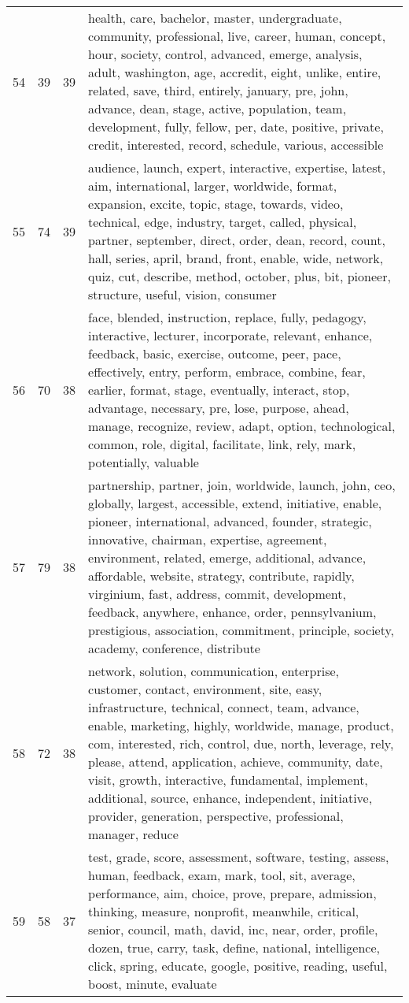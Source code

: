 \begin{table}[ht]
{\begin{tabularx}{\textwidth}{llrX}
   54 & 39 & 39 & health, care, bachelor, master, undergraduate, community, professional, live, career, human, concept, hour, society, control, advanced, emerge, analysis, adult, washington, age, accredit, eight, unlike, entire, related, save, third, entirely, january, pre, john, advance, dean, stage, active, population, team, development, fully, fellow, per, date, positive, private, credit, interested, record, schedule, various, accessible \\ 
   55 & 74 & 39 & audience, launch, expert, interactive, expertise, latest, aim, international, larger, worldwide, format, expansion, excite, topic, stage, towards, video, technical, edge, industry, target, called, physical, partner, september, direct, order, dean, record, count, hall, series, april, brand, front, enable, wide, network, quiz, cut, describe, method, october, plus, bit, pioneer, structure, useful, vision, consumer \\ 
   56 & 70 & 38 & face, blended, instruction, replace, fully, pedagogy, interactive, lecturer, incorporate, relevant, enhance, feedback, basic, exercise, outcome, peer, pace, effectively, entry, perform, embrace, combine, fear, earlier, format, stage, eventually, interact, stop, advantage, necessary, pre, lose, purpose, ahead, manage, recognize, review, adapt, option, technological, common, role, digital, facilitate, link, rely, mark, potentially, valuable \\ 
   57 & 79 & 38 & partnership, partner, join, worldwide, launch, john, ceo, globally, largest, accessible, extend, initiative, enable, pioneer, international, advanced, founder, strategic, innovative, chairman, expertise, agreement, environment, related, emerge, additional, advance, affordable, website, strategy, contribute, rapidly, virginium, fast, address, commit, development, feedback, anywhere, enhance, order, pennsylvanium, prestigious, association, commitment, principle, society, academy, conference, distribute \\ 
   58 & 72 & 38 & network, solution, communication, enterprise, customer, contact, environment, site, easy, infrastructure, technical, connect, team, advance, enable, marketing, highly, worldwide, manage, product, com, interested, rich, control, due, north, leverage, rely, please, attend, application, achieve, community, date, visit, growth, interactive, fundamental, implement, additional, source, enhance, independent, initiative, provider, generation, perspective, professional, manager, reduce \\ 
   59 & 58 & 37 & test, grade, score, assessment, software, testing, assess, human, feedback, exam, mark, tool, sit, average, performance, aim, choice, prove, prepare, admission, thinking, measure, nonprofit, meanwhile, critical, senior, council, math, david, inc, near, order, profile, dozen, true, carry, task, define, national, intelligence, click, spring, educate, google, positive, reading, useful, boost, minute, evaluate \\ 

\end{tabularx}}
\end{table}
